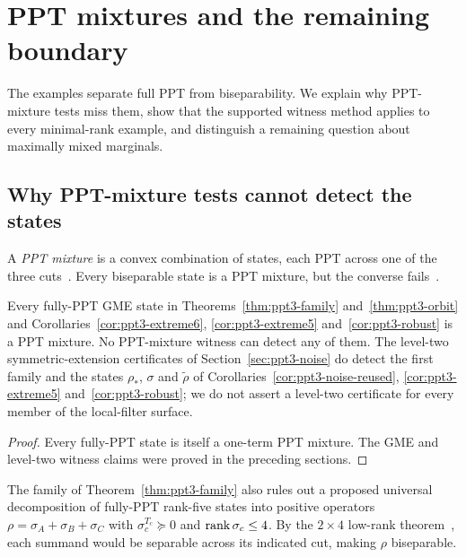 \section{PPT mixtures and the remaining boundary}\label{sec:ppt3-relaxations}

The examples separate full PPT from biseparability. We explain why PPT-mixture tests miss them, show that the supported
witness method applies to every minimal-rank example, and distinguish a remaining question about maximally mixed marginals.

\subsection{Why PPT-mixture tests cannot detect the states}

A \emph{PPT mixture} is a convex combination of states, each PPT
across one of the three cuts~\cite{JMG,NMG}. Every biseparable
state is a PPT mixture, but the converse fails~\cite{HK}.

\begin{corollary}\label{cor:ppt3-ppt-mixture}
Every fully-PPT GME state in Theorems~\ref{thm:ppt3-family}
and~\ref{thm:ppt3-orbit} and Corollaries~\ref{cor:ppt3-extreme6},
\ref{cor:ppt3-extreme5} and~\ref{cor:ppt3-robust} is a
PPT mixture. No PPT-mixture witness can detect any of them.
The level-two symmetric-extension certificates of
Section~\ref{sec:ppt3-noise} do detect the first family and
the states $\rho_*$, $\sigma$ and $\tilde\rho$ of Corollaries~\ref{cor:ppt3-noise-reused},
\ref{cor:ppt3-extreme5} and~\ref{cor:ppt3-robust}; we do not assert a level-two certificate for
every member of the local-filter surface.
\end{corollary}
\begin{proof}
Every fully-PPT state is itself a one-term PPT mixture. The GME and level-two witness claims
were proved in the preceding sections.
\end{proof}

\begin{remark}\label{rem:ppt3-splitting}
The family of Theorem~\ref{thm:ppt3-family} also rules out a proposed universal decomposition
of fully-PPT rank-five states into positive operators
$\rho=\sigma_A+\sigma_B+\sigma_C$ with
$\sigma_c^{T_c}\succeq0$ and $\operatorname{rank}\sigma_c\le4$.
By the $2\times4$ low-rank theorem~\cite{KCKL,HLVC},
each summand would be separable across its indicated cut,
making $\rho$ biseparable.
\end{remark}


